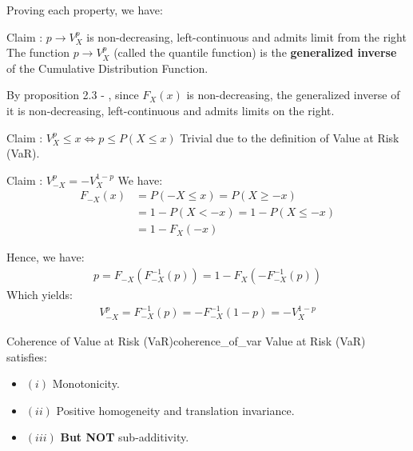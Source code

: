 \begin{proof*}
    Proving each property, we have:
    \begin{subproof}{\newline Claim : $p\to V_X^p$ is non-decreasing, left-continuous and admits limit from the right}
        The function $p\to V_X^p$ (called the quantile function) is the \textbf{generalized inverse} of the Cumulative Distribution Function.

        \noindent\newline By proposition 2.3 - \cite{article:Embrechts2013}, since $F_X(x)$ is non-decreasing, the generalized inverse of it is non-decreasing, left-continuous and admits limits on the right.
    \end{subproof}

    \begin{subproof}{\newline Claim : $V_X^p \le x \iff p\le P(X\le x)$}
        Trivial due to the definition of Value at Risk (VaR).
    \end{subproof}

    \begin{subproof}{\newline Claim : $V_{-X}^p = -V_X^{1-p}$}
        We have:
        \begin{align*}
            F_{-X}(x) &= P(-X \le x) = P(X \ge -x) \\
                &= 1 - P(X < -x) = 1 - P(X \le -x) \\
                &= 1 - F_X(-x)
        \end{align*}

        \noindent Hence, we have:
        \begin{align*}
            p = F_{-X}(F_{-X}^{-1}(p)) = 1 - F_X(-F_{-X}^{-1}(p))
        \end{align*}
        \noindent Which yields:
        \begin{align}
            V_{-X}^p = F_{-X}^{-1}(p) = -F_{-X}^{-1}(1-p) = -V_X^{1-p}
        \end{align}
    \end{subproof}
\end{proof*}

\begin{theorem}{Coherence of Value at Risk (VaR)}{coherence_of_var}
    Value at Risk (VaR) satisfies:
    \begin{itemize}
        \item $(i)$ Monotonicity.
        \item $(ii)$ Positive homogeneity and translation invariance.
        \item $(iii)$ \textbf{But NOT} sub-additivity.
    \end{itemize}
\end{theorem}

